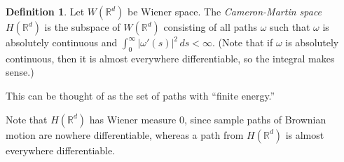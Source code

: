 \documentclass[12pt]{article}
\theoremstyle{definition}
\newtheorem{definition}{Definition}
\begin{document}
\begin{definition}
Let $W(\mathbb{R}^d)$ be Wiener space.  The \emph{Cameron-Martin space} $H(\mathbb{R}^d)$ is the subspace of $W(\mathbb{R}^d)$ consisting of all paths $\omega$ such that $\omega$ is absolutely continuous and $\int_0^\infty |\omega'(s)|^2\,ds < \infty$.  (Note that if $\omega$ is absolutely continuous, then it is almost everywhere differentiable, so the integral makes sense.)
\end{definition}

This can be thought of as the set of paths with ``finite energy.''

Note that $H(\mathbb{R}^d)$ has Wiener measure $0$, since sample paths of Brownian motion are nowhere differentiable, whereas a path from $H(\mathbb{R}^d)$ is almost everywhere differentiable.

\end{document}
